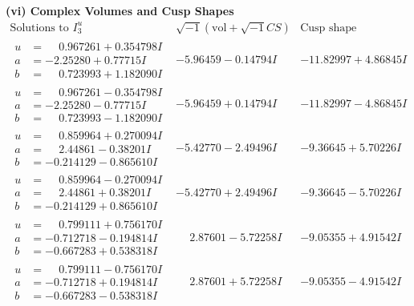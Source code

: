 \documentclass[1p]{elsarticle_modified}
\theoremstyle{definition}
\newcommand{\I}{\sqrt{-1}}
\begin{document}
\newpage\flushleft \textbf{(vi) Complex Volumes and Cusp Shapes}
$$\begin{array}{c|c|c}  
\text{Solutions to }I^u_{3}& \I (\text{vol} + \sqrt{-1}CS) & \text{Cusp shape}\\
 \hline 
\begin{aligned}
u &= \phantom{-}0.967261 + 0.354798 I \\
a &= -2.25280 + 0.77715 I \\
b &= \phantom{-}0.723993 + 1.182090 I\end{aligned}
 & -5.96459 - 0.14794 I & -11.82997 + 4.86845 I \\ \hline\begin{aligned}
u &= \phantom{-}0.967261 - 0.354798 I \\
a &= -2.25280 - 0.77715 I \\
b &= \phantom{-}0.723993 - 1.182090 I\end{aligned}
 & -5.96459 + 0.14794 I & -11.82997 - 4.86845 I \\ \hline\begin{aligned}
u &= \phantom{-}0.859964 + 0.270094 I \\
a &= \phantom{-}2.44861 - 0.38201 I \\
b &= -0.214129 - 0.865610 I\end{aligned}
 & -5.42770 - 2.49496 I & -9.36645 + 5.70226 I \\ \hline\begin{aligned}
u &= \phantom{-}0.859964 - 0.270094 I \\
a &= \phantom{-}2.44861 + 0.38201 I \\
b &= -0.214129 + 0.865610 I\end{aligned}
 & -5.42770 + 2.49496 I & -9.36645 - 5.70226 I \\ \hline\begin{aligned}
u &= \phantom{-}0.799111 + 0.756170 I \\
a &= -0.712718 - 0.194814 I \\
b &= -0.667283 + 0.538318 I\end{aligned}
 & \phantom{-}2.87601 - 5.72258 I & -9.05355 + 4.91542 I \\ \hline\begin{aligned}
u &= \phantom{-}0.799111 - 0.756170 I \\
a &= -0.712718 + 0.194814 I \\
b &= -0.667283 - 0.538318 I\end{aligned}
 & \phantom{-}2.87601 + 5.72258 I & -9.05355 - 4.91542 I \\ \hline\begin{aligned}

\end{aligned}
\end{array}$$
\end{document}

